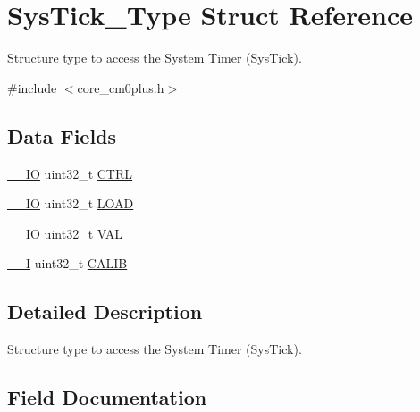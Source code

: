 \hypertarget{struct_sys_tick___type}{}\section{Sys\+Tick\+\_\+\+Type Struct Reference}
\label{struct_sys_tick___type}


Structure type to access the System Timer (Sys\+Tick).  




{\ttfamily \#include $<$core\+\_\+cm0plus.\+h$>$}

\subsection*{Data Fields}
\begin{DoxyCompactItemize}
\item 
\mbox{\hyperlink{core__cm0plus_8h_aec43007d9998a0a0e01faede4133d6be}{\+\_\+\+\_\+\+IO}} uint32\+\_\+t \mbox{\hyperlink{struct_sys_tick___type_a15fc8d35f045f329b80c544bef35ff64}{C\+T\+RL}}
\item 
\mbox{\hyperlink{core__cm0plus_8h_aec43007d9998a0a0e01faede4133d6be}{\+\_\+\+\_\+\+IO}} uint32\+\_\+t \mbox{\hyperlink{struct_sys_tick___type_aad9adf4efc940cddb8161b69cfbe19d3}{L\+O\+AD}}
\item 
\mbox{\hyperlink{core__cm0plus_8h_aec43007d9998a0a0e01faede4133d6be}{\+\_\+\+\_\+\+IO}} uint32\+\_\+t \mbox{\hyperlink{struct_sys_tick___type_a26fb318c3b0a0ec7f45daafd5f8799a3}{V\+AL}}
\item 
\mbox{\hyperlink{core__cm0plus_8h_af63697ed9952cc71e1225efe205f6cd3}{\+\_\+\+\_\+I}} uint32\+\_\+t \mbox{\hyperlink{struct_sys_tick___type_a40e07d0a4638a676780713b6ceeec4ef}{C\+A\+L\+IB}}
\end{DoxyCompactItemize}


\subsection{Detailed Description}
Structure type to access the System Timer (Sys\+Tick). 

\subsection{Field Documentation}
\mbox{\label{struct_sys_tick___type_a40e07d0a4638a676780713b6ceeec4ef}} 
